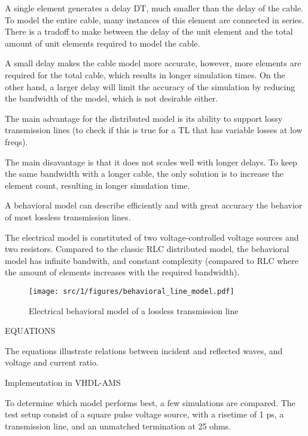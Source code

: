 A single element generates a delay DT, much smaller than the delay of the cable.
To model the entire cable, many instances of this element are connected in series.
There is a tradoff to make between the delay of the unit element and the total amount of unit elements required to model the cable.

A small delay makes the cable model more accurate, however, more elements are required for the total cable, which results in longer simulation times.
On the other hand, a larger delay will limit the accuracy of the simulation by reducing the bandwidth of the model, which is not desirable either.

The main advantage for the distributed model is its ability to support lossy transmission lines (to check if this is true for a TL that has variable losses at low freqs).

The main disavantage is that it does not scales well with longer delays.
To keep the same bandwidth with a longer cable, the only solution is to increase the element count, resulting in longer simulation time.

A behavioral model can describe efficiently and with great accuracy the behavior of most lossless transmission lines.

The electrical model is constituted of two voltage-controlled voltage sources and two resistors.
Compared to the classic RLC distributed model, the behavioral model has infinite bandwith, and constant complexity (compared to RLC where the amount of elements increases with the required bandwidth).

\begin{figure}[!h]
  \centering
  \texttt{[image: src/1/figures/behavioral\_line\_model.pdf]}
  \caption{Electrical behavioral model of a lossless transmission line}
  \label{fig:beh-line-model}
\end{figure}

EQUATIONS

The equations illustrate relations between incident and reflected waves, and voltage and current ratio.

Implementation in VHDL-AMS



To determine which model performs best, a few simulations are compared.
The test setup consist of a square pulse voltage source, with a risetime of 1 ps, a transmission line, and an unmatched termination at 25 ohms.

